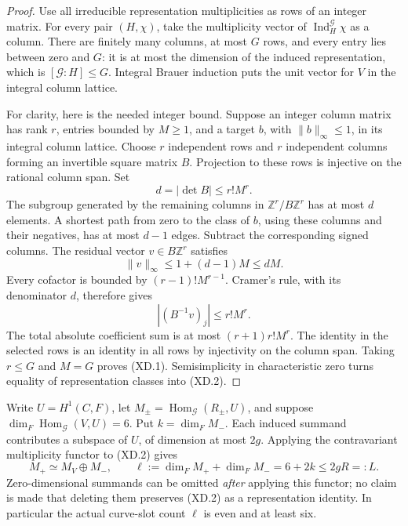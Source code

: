 \begin{proof}
Use all irreducible representation multiplicities as rows of an
integer matrix.  For every pair \((H,\chi)\), take the multiplicity
vector of \(\operatorname{Ind}_H^{\mathcal G}\chi\) as a column.
There are finitely many columns, at most \(G\) rows, and every
entry lies between zero and \(G\): it is at most the dimension of
the induced representation, which is \([\mathcal G:H]\leq G\).
Integral Brauer induction puts the unit vector for \(V\) in the
integral column lattice.

For clarity, here is the needed integer bound.  Suppose an integer
column matrix has rank \(r\), entries bounded by \(M\geq1\), and a
target \(b\), with \(\|b\|_\infty\leq1\), in its integral column
lattice.  Choose \(r\) independent rows and \(r\) independent
columns forming an invertible square matrix \(B\).  Projection to
these rows is injective on the rational column span.  Set
\[
                    d=|\det B|\leq r!M^r.
\]
The subgroup generated by the remaining columns in
\(\mathbb Z^r/B\mathbb Z^r\) has at most \(d\) elements.  A shortest
path from zero to the class of \(b\), using these columns and
their negatives, has at most \(d-1\) edges.  Subtract the corresponding
signed columns.  The residual vector \(v\in B\mathbb Z^r\) satisfies
\[
                  \|v\|_\infty\leq1+(d-1)M\leq dM.
\]
Every cofactor is bounded by \((r-1)!M^{r-1}\).  Cramer's rule,
with its denominator \(d\), therefore gives
\[
              |(B^{-1}v)_j|\leq r!M^r.
\]
The total absolute coefficient sum is at most
\((r+1)r!M^r\).  The identity in the selected rows is an identity
in all rows by injectivity on the column span.  Taking \(r\leq G\)
and \(M=G\) proves (XD.1).  Semisimplicity in characteristic zero
turns equality of representation classes into (XD.2).
\end{proof}

Write \(U=H^1(C,F)\), let \(M_\pm=\operatorname{Hom}_{\mathcal G}(R_\pm,U)\),
and suppose \(\dim_F\operatorname{Hom}_{\mathcal G}(V,U)=6\).
Put \(k=\dim_F M_-\).  Each induced summand contributes a subspace
of \(U\), of dimension at most \(2g\).  Applying the contravariant
multiplicity functor to (XD.2) gives
\[
 M_+\simeq M_V\oplus M_-,\qquad
 \ell:=\dim_F M_++\dim_F M_-=6+2k\leq2gR=:L.                \tag{XD.3}
\]
Zero-dimensional summands can be omitted \emph{after} applying this
functor; no claim is made that deleting them preserves (XD.2) as a
representation identity.  In particular the actual curve-slot count
\(\ell\) is even and at least six.

